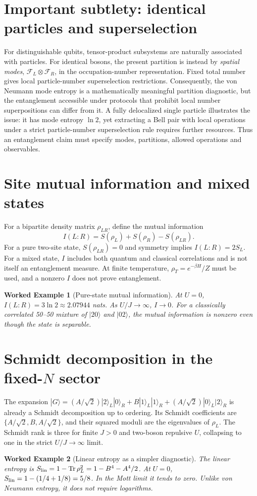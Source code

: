 \documentclass[11pt,a4paper]{article}
\newtheorem{example}{Worked Example}
\newcommand{\tr}{\operatorname{Tr}}
\begin{document}
\section{Important subtlety: identical particles and superselection}
For distinguishable qubits, tensor-product subsystems are naturally associated with particles. For identical bosons, the present partition is instead by \emph{spatial modes}, $\mathcal F_L\otimes\mathcal F_R$, in the occupation-number representation. Fixed total number gives local particle-number superselection restrictions. Consequently, the von Neumann mode entropy is a mathematically meaningful partition diagnostic, but the entanglement accessible under protocols that prohibit local number superpositions can differ from it. A fully delocalized single particle illustrates the issue: it has mode entropy $\ln2$, yet extracting a Bell pair with local operations under a strict particle-number superselection rule requires further resources. Thus an entanglement claim must specify modes, partitions, allowed operations and observables.
\section{Site mutual information and mixed states}
For a bipartite density matrix $\rho_{LR}$, define the mutual information
\begin{equation}I(L:R)=S(\rho_L)+S(\rho_R)-S(\rho_{LR}).\end{equation}
For a pure two-site state, $S(\rho_{LR})=0$ and symmetry implies $I(L:R)=2S_L$. For a mixed state, $I$ includes both quantum and classical correlations and is not itself an entanglement measure. At finite temperature, $\rho_T=e^{-\beta H}/Z$ must be used, and a nonzero $I$ does not prove entanglement.
\begin{example}[Pure-state mutual information]
At $U=0$, $I(L:R)=3\ln2\approx2.07944$ nats. As $U/J\to\infty$, $I\to0$. For a classically correlated 50--50 mixture of $|20\rangle$ and $|02\rangle$, the mutual information is nonzero even though the state is separable.
\end{example}
\section{Schmidt decomposition in the fixed-$N$ sector}
The expansion $|G\rangle=(A/\sqrt2)|2\rangle_L|0\rangle_R+B|1\rangle_L|1\rangle_R+(A/\sqrt2)|0\rangle_L|2\rangle_R$ is already a Schmidt decomposition up to ordering. Its Schmidt coefficients are $\{A/\sqrt2,B,A/\sqrt2\}$, and their squared moduli are the eigenvalues of $\rho_L$. The Schmidt rank is three for finite $J>0$ and two-boson repulsive $U$, collapsing to one in the strict $U/J\to\infty$ limit.
\begin{example}[Linear entropy as a simpler diagnostic]
The linear entropy is $S_{\rm lin}=1-\tr\rho_L^2=1-B^4-A^4/2$. At $U=0$, $S_{\rm lin}=1-(1/4+1/8)=5/8$. In the Mott limit it tends to zero. Unlike von Neumann entropy, it does not require logarithms.
\end{example}
\end{document}
